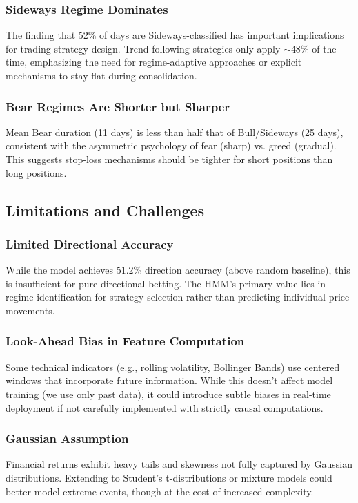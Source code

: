 \documentclass[conference]{IEEEtran}
\begin{document}
\subsubsection{Sideways Regime Dominates}
The finding that 52\% of days are Sideways-classified has important implications for trading strategy design. Trend-following strategies only apply $\sim$48\% of the time, emphasizing the need for regime-adaptive approaches or explicit mechanisms to stay flat during consolidation.

\subsubsection{Bear Regimes Are Shorter but Sharper}
Mean Bear duration (11 days) is less than half that of Bull/Sideways (25 days), consistent with the asymmetric psychology of fear (sharp) vs. greed (gradual). This suggests stop-loss mechanisms should be tighter for short positions than long positions.

\subsection{Limitations and Challenges}

\subsubsection{Limited Directional Accuracy}
While the model achieves 51.2\% direction accuracy (above random baseline), this is insufficient for pure directional betting. The HMM's primary value lies in regime identification for strategy selection rather than predicting individual price movements.

\subsubsection{Look-Ahead Bias in Feature Computation}
Some technical indicators (e.g., rolling volatility, Bollinger Bands) use centered windows that incorporate future information. While this doesn't affect model training (we use only past data), it could introduce subtle biases in real-time deployment if not carefully implemented with strictly causal computations.

\subsubsection{Gaussian Assumption}
Financial returns exhibit heavy tails and skewness not fully captured by Gaussian distributions. Extending to Student's t-distributions or mixture models could better model extreme events, though at the cost of increased complexity.
\end{document}
